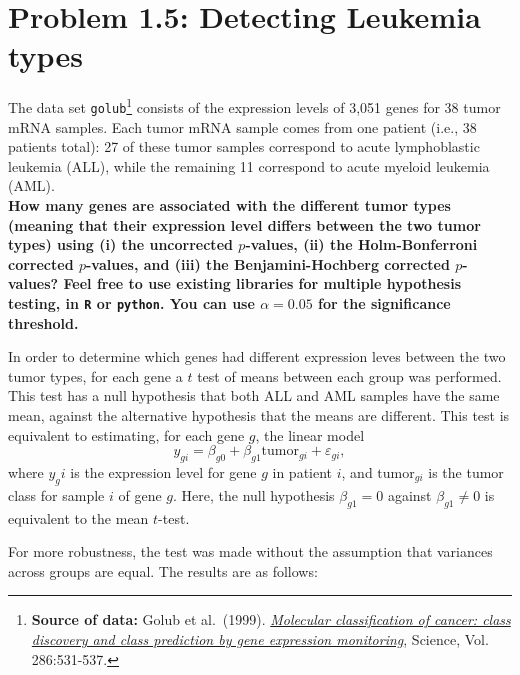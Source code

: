 \documentclass[11pt, english]{article}
\begin{document}
\newpage
    \hypertarget{problem-1.5-detecting-leukemia-types}{%
\section*{\texorpdfstring{\textbf{Problem 1.5:} Detecting Leukemia
types}{Problem 1.5: Detecting Leukemia types}}\label{problem-1.5-detecting-leukemia-types}}

The data set \texttt{golub}\footnote{\textbf{Source of data:} Golub et al.~(1999).
\href{https://www.science.org/doi/10.1126/science.286.5439.531?url_ver=Z39.88-2003\&rfr_id=ori:rid:crossref.org\&rfr_dat=cr_pub\%20\%200pubmed}{\emph{Molecular
classification of cancer: class discovery and class prediction by gene
expression monitoring}}, Science, Vol. 286:531-537.} consists of the expression levels of 3,051
genes for 38 tumor mRNA samples. Each tumor mRNA sample comes from one
patient (i.e., 38 patients total): 27 of these tumor samples correspond
to acute lymphoblastic leukemia (ALL), while the remaining 11 correspond
to acute myeloid leukemia (AML).\\[1ex]

{\bf How many genes are associated with the
different tumor types (meaning that their expression level differs
between the two tumor types) using (i) the uncorrected \(p\)-values,
(ii) the Holm-Bonferroni corrected \(p\)-values, and (iii) the
Benjamini-Hochberg corrected \(p\)-values? Feel free to use existing
libraries for multiple hypothesis testing, in \texttt{R} or
\texttt{python}. You can use \(\alpha = 0.05\) for the significance
threshold.}

    In order to determine which genes had different expression leves between
the two tumor types, for each gene a \(t\) test of means between each
group was performed. This test has a null hypothesis that both ALL and
AML samples have the same mean, against the alternative hypothesis that
the means are different. This test is equivalent to estimating, for each
gene \(g\), the linear model
\[y_{gi} = \beta_{g0} + \beta_{g1}\text{tumor}_{gi} + \varepsilon_{gi},\]
where \(y_gi\) is the expression level for gene \(g\) in patient \(i\),
and \(\text{tumor}_{gi}\) is the tumor class for sample \(i\) of gene
\(g\). Here, the null hypothesis \(\beta_{g1} = 0\) against
\(\beta_{g1} \neq 0\) is equivalent to the mean \(t\)-test.

For more robustness, the test was made without the assumption that
variances across groups are equal. The results are as follows:
\end{document}
